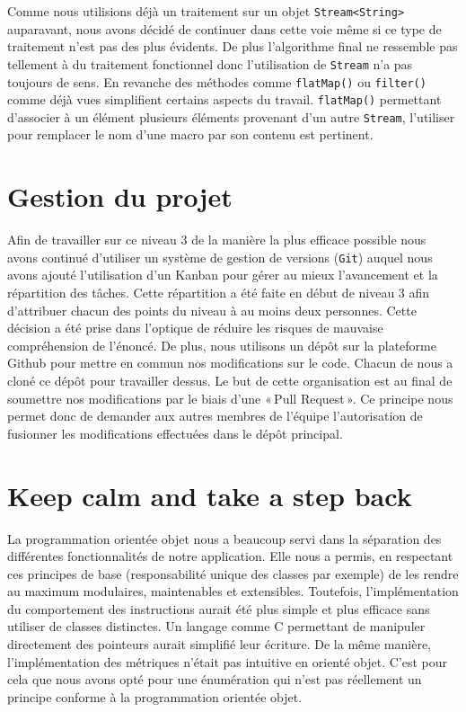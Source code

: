 \documentclass[titlepage]{article}
\begin{document}
    Comme nous utilisions déjà un traitement sur un objet \texttt{Stream<String>} auparavant, nous avons décidé de continuer dans cette voie même si ce type de traitement n'est pas des plus évidents. De plus l'algorithme final ne ressemble pas tellement à du traitement fonctionnel donc l'utilisation de \texttt{Stream} n'a pas toujours de sens. En revanche des méthodes comme \texttt{flatMap()} ou \texttt{filter()} comme déjà vues simplifient certains aspects du travail. \texttt{flatMap()} permettant d'associer à un élément plusieurs éléments provenant d'un autre \texttt{Stream}, l'utiliser pour remplacer le nom d'une macro par son contenu est pertinent.


\section{Gestion du projet}


Afin de travailler sur ce niveau 3 de la manière la plus efficace possible nous avons continué d'utiliser un système de gestion de versions (\texttt{Git}) auquel nous avons ajouté l'utilisation d'un Kanban pour gérer au mieux l'avancement et la répartition des tâches. Cette répartition a été faite en début de niveau 3 afin d'attribuer chacun des points du niveau à au moins deux personnes. Cette décision a été prise dans l'optique de réduire les risques de mauvaise compréhension de l'énoncé.
De plus, nous utilisons un dépôt sur la plateforme Github pour mettre en commun nos modifications sur le code. Chacun de nous a cloné ce dépôt pour travailler dessus. Le but de cette organisation est au final de soumettre nos modifications par le biais d'une « Pull Request ». Ce principe nous permet donc de demander aux autres membres de l'équipe l'autorisation de fusionner les modifications effectuées dans le dépôt principal.

\section{Keep calm and take a step back}

La programmation orientée objet nous a beaucoup servi dans la séparation des différentes fonctionnalités de notre application. Elle nous a permis, en respectant ces principes de base (responsabilité unique des classes par exemple) de les rendre au maximum modulaires, maintenables et extensibles. Toutefois, l'implémentation du comportement des instructions aurait été plus simple et plus efficace sans utiliser de classes distinctes. Un langage comme C permettant de manipuler directement des pointeurs aurait simplifié leur écriture. De la même manière, l'implémentation des métriques n'était pas intuitive en orienté objet. C'est pour cela que nous avons opté pour une énumération qui n'est pas réellement un principe conforme à la programmation orientée objet.
\end{document}
